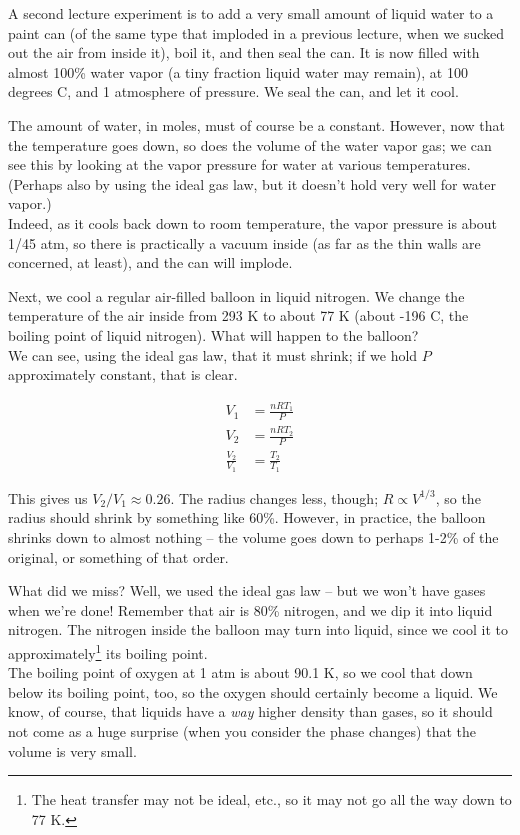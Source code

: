 \documentclass[8.01x]{subfiles}
\begin{document}
A second lecture experiment is to add a very small amount of liquid water to a paint can (of the same type that imploded in a previous lecture, when we sucked out the air from inside it), boil it, and then seal the can. It is now filled with almost 100\% water vapor (a tiny fraction liquid water may remain), at 100 degrees C, and 1 atmosphere of pressure. We seal the can, and let it cool.

The amount of water, in moles, must of course be a constant. However, now that the temperature goes down, so does the volume of the water vapor gas; we can see this by looking at the vapor pressure for water at various temperatures. (Perhaps also by using the ideal gas law, but it doesn't hold very well for water vapor.)\\
Indeed, as it cools back down to room temperature, the vapor pressure is about 1/45 atm, so there is practically a vacuum inside (as far as the thin walls are concerned, at least), and the can will implode.

Next, we cool a regular air-filled balloon in liquid nitrogen. We change the temperature of the air inside from 293 K to about 77 K (about -196 C, the boiling point of liquid nitrogen). What will happen to the balloon?\\
We can see, using the ideal gas law, that it must shrink; if we hold $P$ approximately constant, that is clear.

\begin{align}
V_1 &= \frac{n R T_1}{P}\\
V_2 &= \frac{n R T_2}{P}\\
\frac{V_2}{V_1} &= \frac{T_2} {T_1}
\end{align}

This gives us $V_2/V_1 \approx 0.26$. The radius changes less, though; $R \propto V^{1/3}$, so the radius should shrink by something like 60\%. However, in practice, the balloon shrinks down to almost nothing -- the volume goes down to perhaps 1-2\% of the original, or something of that order.

What did we miss? Well, we used the ideal gas law -- but we won't have gases when we're done! Remember that air is 80\% nitrogen, and we dip it into liquid nitrogen. The nitrogen inside the balloon may turn into liquid, since we cool it to approximately\footnote{The heat transfer may not be ideal, etc., so it may not go all the way down to 77 K.} its boiling point.\\
The boiling point of oxygen at 1 atm is about 90.1 K, so we cool that down below its boiling point, too, so the oxygen should certainly become a liquid. We know, of course, that liquids have a \emph{way} higher density than gases, so it should not come as a huge surprise (when you consider the phase changes) that the volume is very small.
\end{document}
